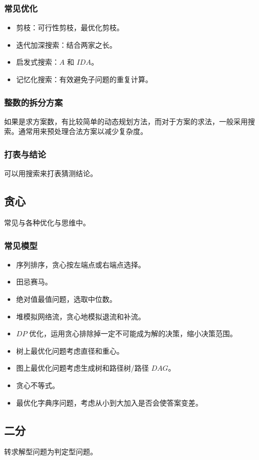 \documentclass[UTF-8]{ctexart}
\begin{document}
			\subsubsection{常见优化}
			\begin{itemize}
				\item 剪枝：可行性剪枝，最优化剪枝。
				\item 迭代加深搜索：结合两家之长。
				\item 启发式搜索：$A$ 和 $IDA$。
				\item 记忆化搜索：有效避免子问题的重复计算。
			\end{itemize}
			\subsubsection{整数的拆分方案}
			如果是求方案数，有比较简单的动态规划方法，而对于方案的求法，一般采用搜索。通常用来预处理合法方案以减少复杂度。
			\subsubsection{打表与结论}
			可以用搜索来打表猜测结论。
		\subsection{贪心}
		常见与各种优化与思维中。
			\subsubsection{常见模型}
			\begin{itemize}
				\item 序列排序，贪心按左端点或右端点选择。
				\item 田忌赛马。
				\item 绝对值最值问题，选取中位数。
				\item 堆模拟网络流，贪心地模拟退流和补流。
				\item $DP$ 优化，运用贪心排除掉一定不可能成为解的决策，缩小决策范围。
				\item 树上最优化问题考虑直径和重心。
				\item 图上最优化问题考虑生成树和路径树/路径 $DAG$。
				\item 贪心不等式。
				\item 最优化字典序问题，考虑从小到大加入是否会使答案变差。
			\end{itemize}
		\subsection{二分}
		转求解型问题为判定型问题。
\end{document}
